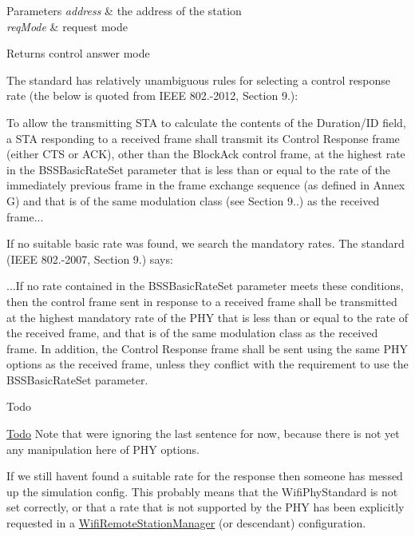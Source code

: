 \begin{DoxyParams}{Parameters}
{\em address} & the address of the station \\
\hline
{\em req\+Mode} & request mode\\
\hline
\end{DoxyParams}
\begin{DoxyReturn}{Returns}
control answer mode 
\end{DoxyReturn}
The standard has relatively unambiguous rules for selecting a control response rate (the below is quoted from I\+E\+EE 802.-\/2012, Section 9.)\+:

To allow the transmitting S\+TA to calculate the contents of the Duration/\+ID field, a S\+TA responding to a received frame shall transmit its Control Response frame (either C\+TS or A\+CK), other than the Block\+Ack control frame, at the highest rate in the B\+S\+S\+Basic\+Rate\+Set parameter that is less than or equal to the rate of the immediately previous frame in the frame exchange sequence (as defined in Annex G) and that is of the same modulation class (see Section 9..) as the received frame...

If no suitable basic rate was found, we search the mandatory rates. The standard (I\+E\+EE 802.-\/2007, Section 9.) says\+:

...If no rate contained in the B\+S\+S\+Basic\+Rate\+Set parameter meets these conditions, then the control frame sent in response to a received frame shall be transmitted at the highest mandatory rate of the P\+HY that is less than or equal to the rate of the received frame, and that is of the same modulation class as the received frame. In addition, the Control Response frame shall be sent using the same P\+HY options as the received frame, unless they conflict with the requirement to use the B\+S\+S\+Basic\+Rate\+Set parameter.

\begin{DoxyRefDesc}{Todo}
\item[\hyperlink{todo__todo000180}{Todo}]Note that we\textquotesingle{}re ignoring the last sentence for now, because there is not yet any manipulation here of P\+HY options. \end{DoxyRefDesc}


If we still haven\textquotesingle{}t found a suitable rate for the response then someone has messed up the simulation config. This probably means that the Wifi\+Phy\+Standard is not set correctly, or that a rate that is not supported by the P\+HY has been explicitly requested in a \hyperlink{classns3_1_1WifiRemoteStationManager}{Wifi\+Remote\+Station\+Manager} (or descendant) configuration.

